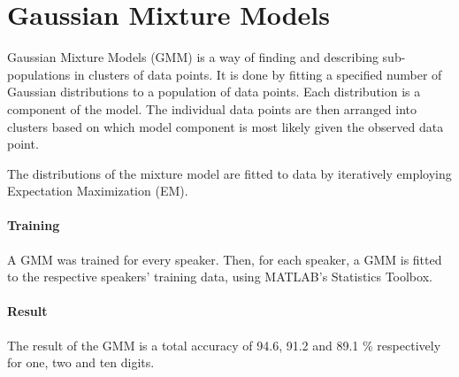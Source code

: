 \section*{Gaussian Mixture Models}
Gaussian Mixture Models (GMM) is a way of finding and describing sub-populations in clusters of data points.
It is done by fitting a specified number of Gaussian distributions to a population of data points.
Each distribution is a component of the model. 
The individual data points are then arranged into clusters based on which model component is most likely given the observed data point.

The distributions of the mixture model are fitted to data by iteratively employing Expectation Maximization (EM).

\paragraph*{Training}
A GMM was trained for every speaker.
Then, for each speaker, a GMM is fitted to the respective speakers' training data, using MATLAB's Statistics Toolbox.

\paragraph*{Result}
The result of the GMM is a total accuracy of 94.6, 91.2 and 89.1 \% respectively for one, two and ten digits. 